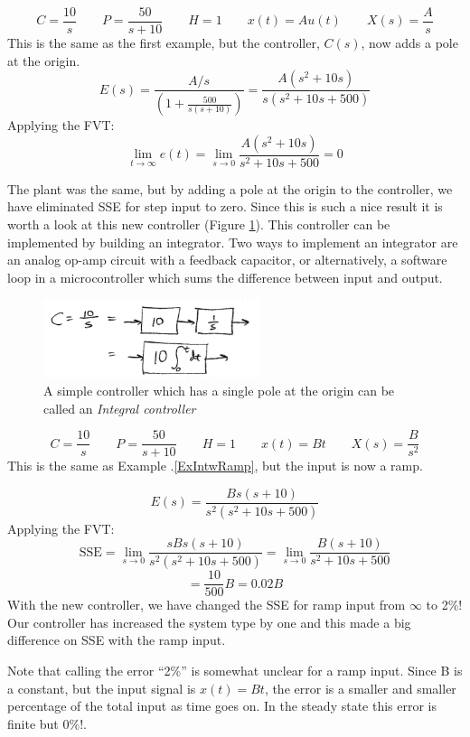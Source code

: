 \begin{ExampleSmall}\label{ExIntwRamp}

\[
C = \frac{10}{s} \qquad P = \frac{50}{s+10} \qquad H = 1 \qquad x(t) = Au(t) \qquad X(s) = \frac{A}{s}
\]
This is the same as the first example, but the controller, $C(s)$, now adds a pole at the origin.
 \[
E(s) = \frac{A/s}{(1+\frac{500}{s(s+10)})} = \frac{A(s^2+10s)}{s(s^2+10s+500)}
\]
Applying the FVT:
\[
\lim_{t\to\infty} e(t) = \lim_{s\to 0} \frac{A(s^2+10s)}{s^2+10s+500} = 0
\]

The plant was the same, but by adding a pole at the  origin to the controller, we have eliminated SSE for step input to zero.
Since this is such a nice result it is worth a look at this new controller (Figure \ref{SimpleIntegralController}).
This controller can be implemented by building an integrator.  Two ways to implement an integrator are an analog op-amp circuit with a feedback capacitor,
or alternatively, a software loop in a microcontroller which sums the difference between input and output.

\end{ExampleSmall}


\begin{figure}\centering
\includegraphics[width=2.5in]{figs09/00786a.png}
\caption{A simple controller which has a single pole at the origin can be called an {\it Integral controller}}\label{SimpleIntegralController}
\end{figure}





\begin{ExampleSmall}\label{ExIntegwithRamp}
\[
C = \frac{10}{s} \qquad P = \frac{50}{s+10} \qquad H = 1 \qquad x(t) = Bt \qquad X(s) = \frac{B}{s^2}
\]
This is the same as Example \thechapter.\ref{ExIntwRamp}, but the input is now a ramp.

\[
E(s) = \frac{Bs(s+10)}{s^2(s^2+10s+500)}
\]
Applying the FVT:
\[
\mathrm{SSE} = \lim_{s\to 0} \frac{sBs(s+10)}{s^2(s^2+10s+500)} = \lim_{s\to 0} \frac{B(s+10)}{s^2+10s+500}
\]
\[
= \frac{10}{500}B = 0.02B
\]
With the new controller, we have changed the SSE for ramp input from $\infty$ to 2\%!   Our controller has increased the system type by one and this made a big difference on SSE with the ramp input.

Note that calling the error ``2\%'' is somewhat unclear for a ramp input.  Since B is a constant, but the input signal is $x(t) = Bt$, the error is a smaller and smaller percentage of the total input as time goes on.  In the steady state this error is finite but $0\%$!.

\end{ExampleSmall}



